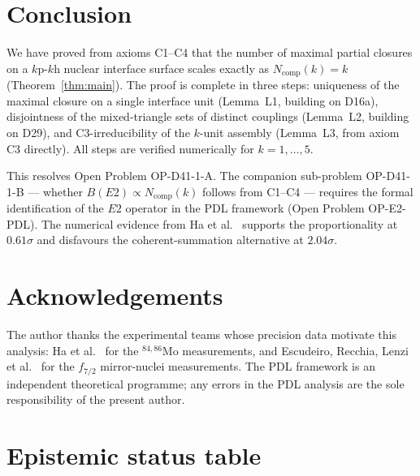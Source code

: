\documentclass[11pt,a4paper]{article}
\theoremstyle{definition}
\theoremstyle{remark}
\newcommand{\Ncomp}{N_{\mathrm{comp}}}
\newcommand{\kph}{k\text{p-}k\text{h}}
\begin{document}
\section{Conclusion}
\label{sec:conclusion}

We have proved from axioms C1--C4 that the number of maximal partial closures on a $\kph$ nuclear interface surface scales exactly as $\Ncomp(k) = k$ (Theorem~\ref{thm:main}). The proof is complete in three steps: uniqueness of the maximal closure on a single interface unit (Lemma~L1, building on D16a), disjointness of the mixed-triangle sets of distinct couplings (Lemma~L2, building on D29), and C3-irreducibility of the $k$-unit assembly (Lemma~L3, from axiom C3 directly). All steps are verified numerically for $k = 1, \ldots, 5$.

This resolves Open Problem OP-D41-1-A. The companion sub-problem OP-D41-1-B --- whether $B(E2) \propto \Ncomp(k)$ follows from C1--C4 --- requires the formal identification of the $E2$ operator in the PDL framework (Open Problem OP-E2-PDL). The numerical evidence from Ha et al.~\cite{Ha_2025} supports the proportionality at $0.61\sigma$ and disfavours the coherent-summation alternative at $2.04\sigma$.

\section*{Acknowledgements}

The author thanks the experimental teams whose precision data motivate this analysis: Ha et al.~\cite{Ha_2025} for the $^{84,86}$Mo measurements, and Escudeiro, Recchia, Lenzi et al.~\cite{Escudeiro_2026} for the $f_{7/2}$ mirror-nuclei measurements. The PDL framework is an independent theoretical programme; any errors in the PDL analysis are the sole responsibility of the present author.

\appendix
\section{Epistemic status table}
\label{app:epistemic}
\end{document}
